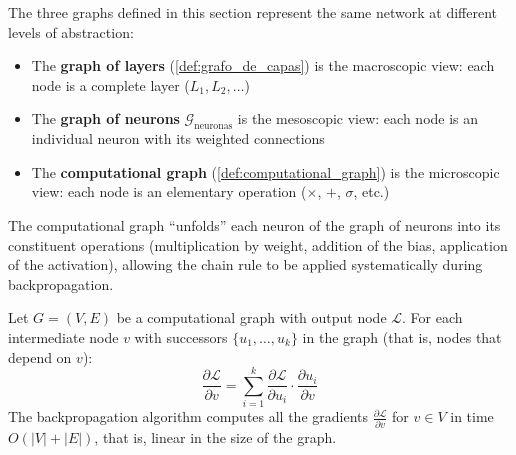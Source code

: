 The three graphs defined in this section represent the same network at different levels of abstraction:
\begin{itemize}
	\item The \textbf{graph of layers} (\autoref{def:grafo_de_capas}) is the macroscopic view: each node is a complete layer ($L_1, L_2, \ldots$)
	\item The \textbf{graph of neurons} $\mathcal{G}_{\text{neuronas}}$ is the mesoscopic view: each node is an individual neuron with its weighted connections
	\item The \textbf{computational graph} (\autoref{def:computational_graph}) is the microscopic view: each node is an elementary operation ($\times$, $+$, $\sigma$, etc.)
\end{itemize}
The computational graph ``unfolds'' each neuron of the graph of neurons into its constituent operations (multiplication by weight, addition of the bias, application of the activation), allowing the chain rule to be applied systematically during backpropagation.

\begin{theorem}\label{thm:backprop}
	Let \(G = (V, E)\) be a computational graph with output node \(\mathcal{L}\). For each intermediate node \(v\) with successors \(\{u_1, \ldots, u_k\}\) in the graph (that is, nodes that depend on \(v\)):
	\[
		\frac{\partial \mathcal{L}}{\partial v} = \sum_{i=1}^{k} \frac{\partial \mathcal{L}}{\partial u_i} \cdot \frac{\partial u_i}{\partial v}
	\]
	The backpropagation algorithm computes all the gradients \(\frac{\partial \mathcal{L}}{\partial v}\) for \(v \in V\) in time \(O(|V| + |E|)\), that is, linear in the size of the graph.
\end{theorem}

